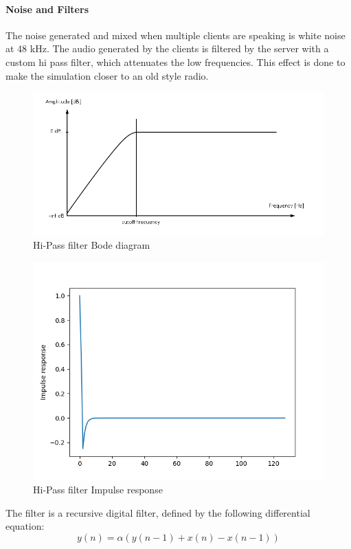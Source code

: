 \documentclass[12pt]{article}
\begin{document}
\paragraph{Noise and Filters \cite{filters}}
The noise generated and mixed when multiple clients are speaking is white noise at 48 kHz. The audio generated by the clients is filtered by the server with a custom hi pass filter, which attenuates the low frequencies. This effect is done to make the simulation closer to an old style radio.\\
\begin{figure}[H]
\includegraphics[width=\textwidth]{hipass}
\caption{Hi-Pass filter Bode diagram}
\end{figure}
\begin{figure}[H]
\includegraphics[width=\textwidth]{impulse_response}
\caption{Hi-Pass filter Impulse response}
\end{figure}
\bigskip
The filter is a recursive digital filter, defined by the following differential equation:
\begin{equation} y(n) =\alpha (y(n-1) + x(n) - x(n-1))\end{equation}
\end{document}
